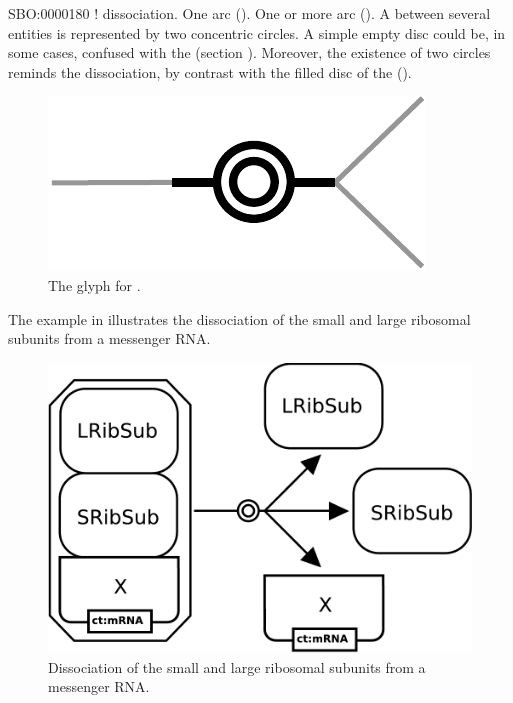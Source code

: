 \begin{glyphDescription}
 \glyphSboTerm SBO:0000180 ! dissociation.
 \glyphOrigin One  arc ().
 \glyphTarget  One or more  arc ().
 \glyphNode A  between several entities is represented by two concentric circles. A simple empty disc could be, in some cases, confused with the  (section ). Moreover, the existence of two circles reminds the dissociation, by contrast with the filled disc of the  ().
 \end{glyphDescription}


\begin{figure}[H]
  \centering
  \includegraphics[scale = 0.5]{images/dissociation}
  \caption{The \PD glyph for .}
  \label{fig:dissociation}
\end{figure}

The example in  illustrates the dissociation of the small and large ribosomal subunits from a messenger RNA.

\begin{figure}[H]
  \centering
  \includegraphics[scale = 0.3]{examples/dissociation-ribosome}
  \caption{Dissociation of the small and large ribosomal subunits from a messenger RNA.}
  \label{fig:dissoc-ribo}
\end{figure}


